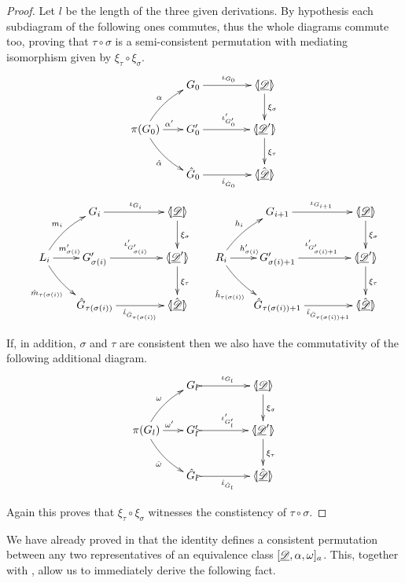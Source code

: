 \begin{proof} Let $l$ be the length of the three given derivations.  By hypothesis each subdiagram of the following ones commutes, thus the whole diagrams commute too, proving that $\tau\circ \sigma$ is a semi-consistent permutation with mediating isomorphism given by $\xi_{\tau} \circ \xi_\sigma$.
		\[\xymatrix@C=18pt{ & G_0 \ar[rr]^{\iota_{G_0}} &&\tpro{D} \ar[d]^{\xi_\sigma} \\ \pi(G_0) \ar@/_.2cm/[dr]_{\hat{\alpha}}\ar@/^.2cm/[ur]^{\alpha} \ar[r]^{\alpha'} &G'_0 \ar[rr]^{\iota'_{G'_0}}  &&\lpro \der{D}'  \rpro \ar[d]^{\xi_{\tau}}\\ &\hat{G}_0  \ar[rr]_{\hat{\iota}_{\hat{G}_0}}&& \lpro \hat{\der{D}}\rpro }\]  
		\[\xymatrix@C=18pt{& G_i \ar[rr]^{\iota_{G_i}} &&\tpro{D} \ar[d]^{\xi_\sigma}&  &  G_{i+1} \ar[rr]^{\iota_{G_{i+1}}} &&\tpro{D} \ar[d]^{\xi_\sigma} \\ L_i \ar@/_.2cm/[dr]_{\hat{m}_{\tau(\sigma(i))}}\ar@/^.2cm/[ur]^{m_i} \ar[r]^{m'_{\sigma(i)}} &G'_{\sigma(i)} \ar[rr]^{\iota'_{G'_{\sigma(i)}}}  &&\lpro \der{D}'  \rpro \ar[d]^{\xi_{\tau}}&R_i \ar@/_.2cm/[dr]_{\hat{h}_{\tau(\sigma(i))}}\ar@/^.2cm/[ur]^{h_i} \ar[r]^{h'_{\sigma(i)}} & G'_{\sigma(i)+1} \ar[rr]^{\iota'_{G'_{\sigma(i)+1}}} && \lpro \der{D}' \rpro \ar[d]^{\xi_{\tau}}\\ &\hat{G}_{\tau(\sigma(i))}  \ar[rr]_-{\hat{\iota}_{\hat{G}_{\tau(\sigma(i))}}}&& \lpro \hat{\der{D}}\rpro  && \hat{G}_{\tau(\sigma(i))+1} \ar[rr]_-{\hat{\iota}_{\hat{G}_{\tau(\sigma(i))+1}}}&& \lpro \hat{\der{D}} \rpro	}\]
	
	If, in addition, $\sigma$ and $\tau$ are consistent then we also have the commutativity of the following additional diagram.
	\[\xymatrix@C=18pt{&   G_{l} \ar@{>->}[rr]^{\iota_{ G_{l}}} &&\tpro{D} \ar[d]^{\xi_\sigma}\\ \pi({ G_{l}})\ar@/_.2cm/[dr]_{\hat{\omega}}\ar@/^.2cm/[ur]^{\omega} \ar[r]^{\omega'} & { G'_{l}} \ar@{>->}[rr]^{\iota'_{{ G'_{l}}}} && \lpro \der{D}' \rpro \ar[d]^{\xi_{\tau}}\\& \hat{G}_l \ar@{>->}[rr]_{\hat{\iota}_{\hat{G}_l}}&& \lpro \hat{\der{D}} \rpro}\]
	
	Again this proves that $\xi_\tau \circ \xi_\sigma$ witnesses the constistency of $\tau\circ \sigma$.
\end{proof}
	
We have already proved in  that the identity defines a consistent permutation between any two representatives of an equivalence class $[\underline{\mathscr{D}}, \alpha, \omega]_a$. This, together with , allow us to immediately derive the following fact.

